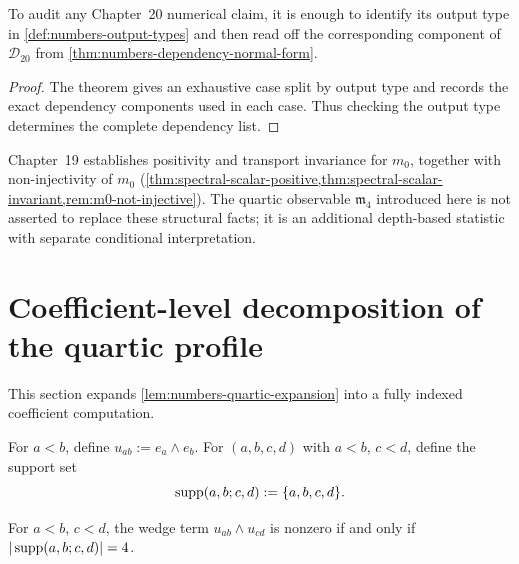 \begin{corollary}
\label{cor:numbers-auditability}
To audit any Chapter~20 numerical claim, it is enough to identify its output
type in \cref{def:numbers-output-types} and then read off the corresponding
component of \(\mathcal D_{20}\) from
\cref{thm:numbers-dependency-normal-form}.
\end{corollary}

\begin{proof}
The theorem gives an exhaustive case split by output type and records the
exact dependency components used in each case.  Thus checking the output type
determines the complete dependency list.
\end{proof}

\begin{remark}
\label{rem:numbers-scope-ch19}
Chapter~19 establishes positivity and transport invariance for
\(m_0\), together with non-injectivity of \(m_0\)
(\cref{thm:spectral-scalar-positive,thm:spectral-scalar-invariant,rem:m0-not-injective}).
The quartic observable \(\mathfrak m_4\) introduced here is not asserted
to replace these structural facts;
it is an additional depth-based statistic with separate conditional
interpretation.
\end{remark}

\section{Coefficient-level decomposition of the quartic profile}
\label{sec:numbers-coeff-decomposition}

This section expands \cref{lem:numbers-quartic-expansion} into a fully
indexed coefficient computation.

\begin{definition}
\label{def:numbers-support}
For \(a<b\), define
\(
  u_{ab}:=e_a\wedge e_b
\).
For \((a,b,c,d)\) with \(a<b\), \(c<d\), define the support set
\[
  \operatorname{supp}(a,b;c,d):=\{a,b,c,d\}.
\]
\end{definition}

\begin{lemma}
\label{lem:numbers-support-criterion}
For \(a<b\), \(c<d\), the wedge term
\(u_{ab}\wedge u_{cd}\) is nonzero if and only if
\(|\operatorname{supp}(a,b;c,d)|=4\).
\end{lemma}

